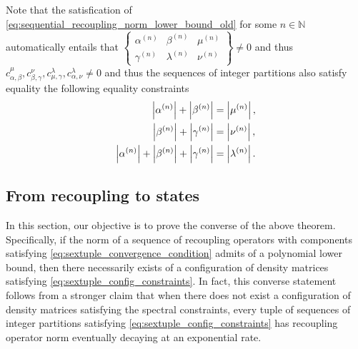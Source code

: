 \documentclass[notitlepage, 10pt]{article}
\begin{document}
\begin{rem}
    Note that the satisfication of \cref{eq:sequential_recoupling_norm_lower_bound_old} for some $n \in \mathbb N$ automatically entails that $\begin{Bmatrix} \alpha^{(n)} & \beta^{(n)} & \mu^{(n)} \\ \gamma^{(n)} & \lambda^{(n)} & \nu^{(n)} \end{Bmatrix} \neq 0$ and thus $c_{\alpha,\beta}^{\mu}, c_{\beta,\gamma}^{\nu}, c_{\mu,\gamma}^{\lambda}, c_{\alpha,\nu}^{\lambda} \neq 0$ and thus the sequences of integer partitions also satisfy equality the following equality constraints
    \begin{align}
        \left|\alpha^{(n)}\right| + \left|\beta^{(n)}\right| &= \left|\mu^{(n)}\right|, \\
        \left|\beta^{(n)}\right| + \left|\gamma^{(n)}\right| &= \left|\nu^{(n)}\right|, \\
        \left|\alpha^{(n)}\right| + \left|\beta^{(n)}\right| + \left|\gamma^{(n)}\right| &= \left|\lambda^{(n)}\right|.
    \end{align}
\end{rem}

\subsection{From recoupling to states}

In this section, our objective is to prove the converse of the above theorem.
Specifically, if the norm of a sequence of recoupling operators with components satisfying \cref{eq:sextuple_convergence_condition} admits of a polynomial lower bound, then there necessarily exists of a configuration of density matrices satisfying \cref{eq:sextuple_config_constraints}.
In fact, this converse statement follows from a stronger claim that when there does not exist a configuration of density matrices satisfying the spectral constraints, every tuple of sequences of integer partitions satisfying \cref{eq:sextuple_config_constraints} has recoupling operator norm eventually decaying at an exponential rate.
\end{document}
